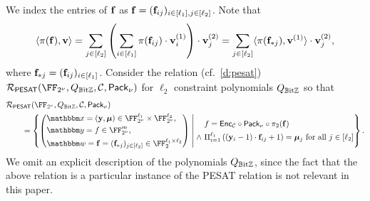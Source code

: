 \documentclass[11pt,letterpaper,usenames,dvipsnames]{article}
\begin{document}

\renewcommand{\modulemorphism}{\ringmorphism}

We  index the entries of $\mathbf{f}$ as $\mathbf{f}=(\mathbf{f}_{ij})_{i\in [\ell_1], j\in[\ell_2]}$. Note that
%
$$
\langle \modulemorphism(\bff), \vv \rangle = \sum_{j\in [\codedim_2]}\left(\sum_{i\in [\codedim_1]} \modulemorphism(\bff_{ij}) \cdot \vv_i^{(1)}\right) \cdot \vv_j^{(2)} = \sum_{j\in [\codedim_2]} \langle \modulemorphism(\bff_{*j}) , \vv^{(1)} \rangle \cdot \vv_j^{(2)},
$$
where $\mathbf{f}_{*j} = (\mathbf{f}_{ij})_{i\in[\ell_1]}$. 
%
%
Consider the relation  (cf.\ \cref{d:pesat}) $\PESAT(\comfield, Q_{\mathbb{B}\text{it}\ZZ},\cC, \pack)$ for $\ell_2$ constraint polynomials $Q_{\mathbb{B}\text{it}\mathbb{Z}}$ so that
%
\begin{align*}
&\PESAT(\comfield, Q_{\mathbb{B}\text{it}\ZZ},\cC, \pack)\\ &\qquad = \left\{ \left(\begin{aligned} &\inp=(\yy,\bm{\mu})\in \comfield^{\codedim_1}\times \comfield^{\codedim_2}, \\&\oracle = f\in \comfield^{\codelength}, \\ &\wit=\bff= (\bff_{*j})_{j\in [\codedim_2]}\in \FF_2^{\codedim_1 \times \codedim_2}\end{aligned}\right) \;\middle|\;  \begin{aligned} &f= \Enc_{\cC}\circ\pack\circ \picomfield(\bff) \\ \wedge \  &\Pi_{i=1}^{\codedim_1} \left((\yy_i-1)\cdot \bff_{ij} +1\right) = \bm{\mu}_j  \text{ for all } j\in [\codedim_2]\end{aligned}  \right\}.
\end{align*}
%
We omit an explicit description of the polynomials $Q_{\mathbb{B}\text{it}\mathbb{Z}}$, since the fact that the above relation is a particular instance of the PESAT relation is not relevant in this paper.
\end{document}
